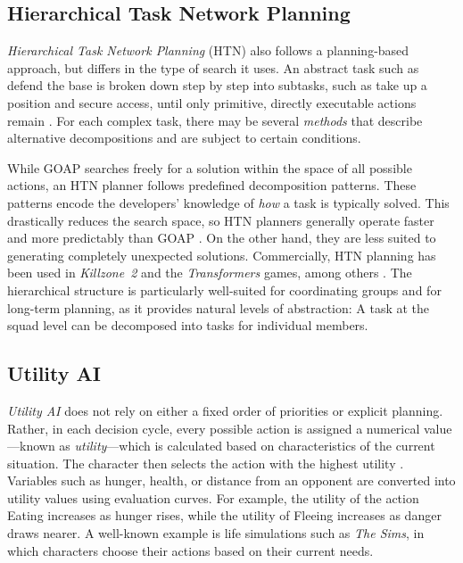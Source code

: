 \subsection{Hierarchical Task Network Planning}

\emph{Hierarchical Task Network Planning} (HTN) also follows a planning-based approach, but differs in the type of search it uses. An abstract task such as \glqq defend the base\grqq{} is broken down step by step into subtasks, such as \glqq take up a position\grqq{} and \glqq secure access\grqq{}, until only primitive, directly executable actions remain \cite{erol1994}. For each complex task, there may be several \emph{methods} that describe alternative decompositions and are subject to certain conditions.

While GOAP searches freely for a solution within the space of all possible actions, an HTN planner follows predefined decomposition patterns. These patterns encode the developers’ knowledge of \emph{how} a task is typically solved. This drastically reduces the search space, so HTN planners generally operate faster and more predictably than GOAP \cite{humphreys2013}. On the other hand, they are less suited to generating completely unexpected solutions. Commercially, HTN planning has been used in \emph{Killzone~2} and the \emph{Transformers} games, among others \cite{humphreys2013}. The hierarchical structure is particularly well-suited for coordinating groups and for long-term planning, as it provides natural levels of abstraction: A task at the squad level can be decomposed into tasks for individual members.

\subsection{Utility AI}

\emph{Utility AI} does not rely on either a fixed order of priorities or explicit planning. Rather, in each decision cycle, every possible action is assigned a numerical value—known as \emph{utility}—which is calculated based on characteristics of the current situation. The character then selects the action with the highest utility \cite{mark2009}. Variables such as hunger, health, or distance from an opponent are converted into utility values using evaluation curves. For example, the utility of the action \glqq Eating\grqq{} increases as hunger rises, while the utility of \glqq Fleeing\grqq{} increases as danger draws nearer. A well-known example is life simulations such as \emph{The Sims}, in which characters choose their actions based on their current needs.

